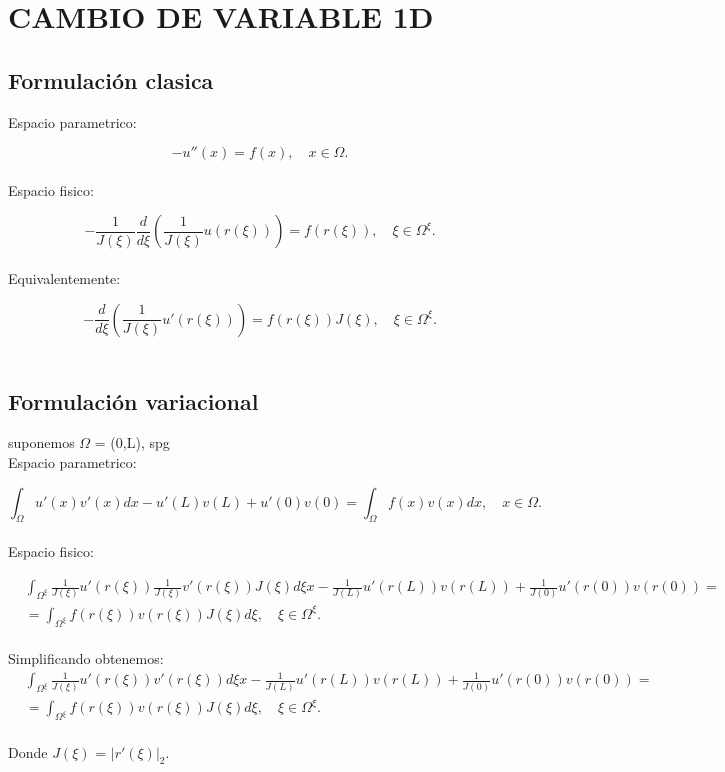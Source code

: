 \documentclass[12pt]{article}
\begin{document}
\section{CAMBIO DE VARIABLE 1D}
\subsection{Formulación clasica}

Espacio parametrico:

\begin{equation*}
-u''(x) = f(x), \quad x \in \Omega .
\end{equation*}\\

Espacio fisico:

\begin{equation*}
-\frac{1}{J(\xi)} \frac{d}{d\xi} \left( \frac{1}{J(\xi)} u(r(\xi)) \right) = f(r(\xi)), \quad \xi \in \Omega^{\xi} .
\end{equation*}\\

Equivalentemente:

\begin{equation*}
-\frac{d}{d\xi} \left( \frac{1}{J(\xi)} u'(r(\xi)) \right) = f(r(\xi))J(\xi), \quad \xi \in \Omega^{\xi} .
\end{equation*}\\


\subsection{Formulación variacional}
suponemos $\Omega$ = (0,L), spg\\
Espacio parametrico:

\begin{equation*}
\int_{\Omega} u'(x)v'(x)dx-u'(L)v(L)+u'(0)v(0) = \int_{\Omega} f(x)v(x)dx, \quad x \in \Omega .
\end{equation*}\\

Espacio fisico:

\begin{align*}
&\int_{\Omega^{\xi}} \frac{1}{J(\xi)} u'(r(\xi)) \frac{1}{J(\xi)} v'(r(\xi)) J(\xi) d\xi x-\frac{1}{J(L)}u'(r(L))v(r(L))+\frac{1}{J(0)}u'(r(0))v(r(0)) =\\
&=\int_{\Omega^{\xi}} f(r(\xi))v(r(\xi)) J(\xi) d\xi, \quad \xi \in \Omega^{\xi} .
\end{align*}\\

Simplificando obtenemos:
\begin{align*}
&\int_{\Omega^{\xi}} \frac{1}{J(\xi)} u'(r(\xi))  v'(r(\xi)) d\xi x-\frac{1}{J(L)}u'(r(L))v(r(L))+\frac{1}{J(0)}u'(r(0))v(r(0)) =\\
&=\int_{\Omega^{\xi}} f(r(\xi))v(r(\xi)) J(\xi) d\xi, \quad \xi \in \Omega^{\xi} .
\end{align*}\\

Donde $J(\xi)$ = $|r'(\xi)|_{2}$.
\end{document}
